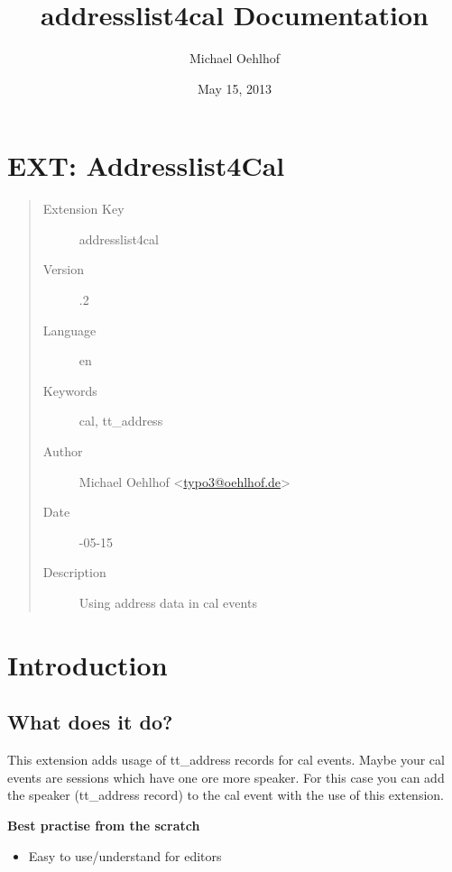 \documentclass[a4paper,10pt,english]{sphinxtypo3manual}
\title{addresslist4cal Documentation}
\date{May 15, 2013}
\author{Michael Oehlhof}
\begin{document}
\maketitle
\tableofcontents
{}\label{index::doc}



\chapter{EXT: Addresslist4Cal}
\label{index:ext-addresslist4cal}\label{index:welcome-to-addresslist4cal-s-documentation}\begin{quote}\begin{description}
\item[{Extension Key}] \leavevmode
addresslist4cal

\item[{Version}] .2

\item[{Language}] \leavevmode
en

\item[{Keywords}] \leavevmode
cal, tt\_address

\item[{Author}] \leavevmode
Michael Oehlhof \textless{}\href{mailto:typo3@oehlhof.de}{typo3@oehlhof.de}\textgreater{}

\item[{Date}] -05-15

\item[{Description}] \leavevmode
Using address data in cal events

\end{description}\end{quote}


\chapter{Introduction}
\label{index:introduction}

\section{What does it do?}
\label{index:what-does-it-do}
This extension adds usage of tt\_address records for cal events.
Maybe your cal events are sessions which have one ore more speaker.
For this case you can add the speaker (tt\_address record) to the cal event
with the use of this extension.

\textbf{Best practise from the scratch}
\begin{itemize}
\item {} 
Easy to use/understand for editors

\end{itemize}
\end{document}
